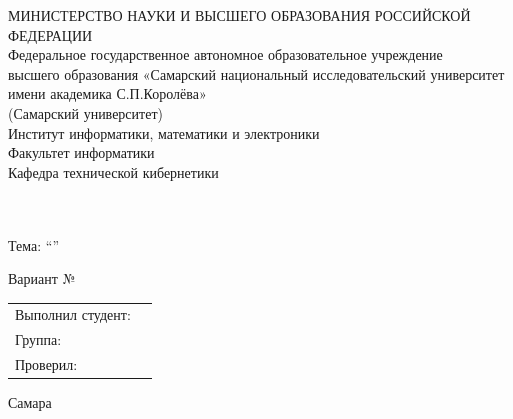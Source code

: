 \begin{titlepage}
							
	\center
							
							
{МИНИСТЕРСТВО НАУКИ И ВЫСШЕГО ОБРАЗОВАНИЯ РОССИЙСКОЙ\\ [-0.2cm]ФЕДЕРАЦИИ}\\[-0.2cm]
{Федеральное государственное автономное образовательное учреждение \\[-0.2cm] высшего образования
«Самарский национальный исследовательский университет \\
[-0.2cm] имени академика С.П.Королёва»\\
[-0.2cm](Самарский университет)}\\[0.1cm]
{Институт информатики, математики и электроники}\\[-0.2cm]
{Факультет информатики}\\[-0.2cm]
{Кафедра технической кибернетики}\\[0.5cm]
						
							
	\vfill\vfill
						    
							
	{\textbf{\subjectTitle}}\\[0.3cm]
	
	{\taskTitle}\\[0.5cm]
						  
    {Тема: \enquote{\textbf{\theme}}}\\[0.5cm]

    \vfill
    
   {Вариант № \variantNumber}\\[0.5cm]


	\vfill\vfill\vfill\vfill\vfill\vfill\vfill\vfill
							
	\begin{minipage}{1\textwidth}
		\begin{center}
			\begin{tabularx}{\textwidth}{X l}
				Выполнил студент:        & \firstAuthorSurName \firstAuthorInitials \\

				Группа:                    & \groupNumber                     		           \\
				Проверил:                  & \teacherName         		                \\
			\end{tabularx}
		\end{center}
	\end{minipage}
							
						
							
	\vfill\vfill\vfill
					
	{\centering Самара \the\year}
							
							
\end{titlepage}


